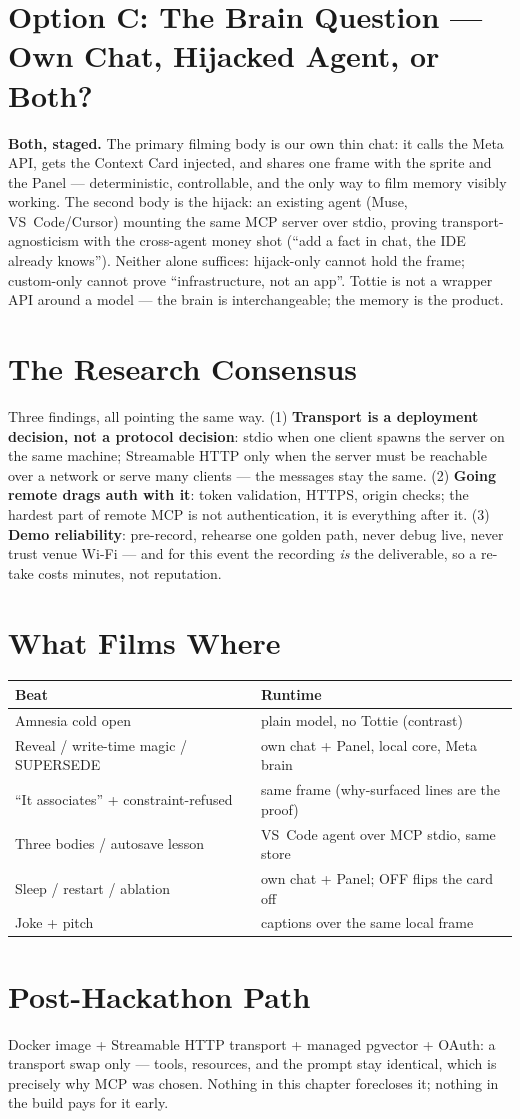 \section{Option C: The Brain Question --- Own Chat, Hijacked Agent, or Both?}
\textbf{Both, staged.} The primary filming body is our own thin chat: it calls the Meta API, gets
the Context Card injected, and shares one frame with the sprite and the Panel --- deterministic,
controllable, and the only way to film memory visibly working. The second body is the hijack: an
existing agent (Muse, VS~Code/Cursor) mounting the same MCP server over stdio, proving
transport-agnosticism with the cross-agent money shot (``add a fact in chat, the IDE already
knows''). Neither alone suffices: hijack-only cannot hold the frame; custom-only cannot prove
``infrastructure, not an app''. Tottie is not a wrapper API around a model --- the brain is
interchangeable; the memory is the product.

\section{The Research Consensus}
Three findings, all pointing the same way. (1) \textbf{Transport is a deployment decision, not a
protocol decision}: stdio when one client spawns the server on the same machine; Streamable HTTP
only when the server must be reachable over a network or serve many clients --- the messages stay
the same. (2) \textbf{Going remote drags auth with it}: token validation, HTTPS, origin checks;
the hardest part of remote MCP is not authentication, it is everything after it. (3)
\textbf{Demo reliability}: pre-record, rehearse one golden path, never debug live, never trust
venue Wi-Fi --- and for this event the recording \emph{is} the deliverable, so a re-take costs
minutes, not reputation.

\section{What Films Where}
\begin{longtable}{@{}p{}p{}@{}}
\toprule
Beat & Runtime \\
\midrule
Amnesia cold open & plain model, no Tottie (contrast) \\
Reveal / write-time magic / SUPERSEDE & own chat + Panel, local core, Meta brain \\
``It associates'' + constraint-refused & same frame (why-surfaced lines are the proof) \\
Three bodies / autosave lesson & VS~Code agent over MCP stdio, same store \\
Sleep / restart / ablation & own chat + Panel; OFF flips the card off \\
Joke + pitch & captions over the same local frame \\
\bottomrule
\end{longtable}

\section{Post-Hackathon Path}
Docker image + Streamable HTTP transport + managed pgvector + OAuth: a transport swap only ---
tools, resources, and the prompt stay identical, which is precisely why MCP was chosen. Nothing
in this chapter forecloses it; nothing in the build pays for it early.
